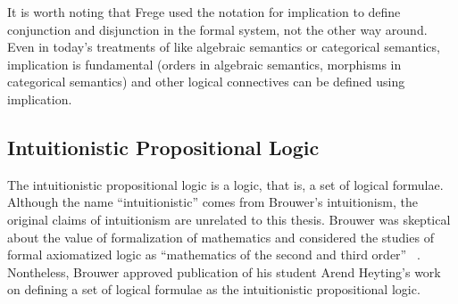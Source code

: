 It is worth noting that Frege used the notation for implication to
define conjunction and
disjunction in the formal system, not the other way around.  Even in
today's treatments of
like algebraic semantics or categorical semantics, implication is
fundamental (orders in algebraic semantics, morphisms in categorical
semantics) and other logical connectives
can be defined using implication.

\subsection{Intuitionistic Propositional Logic}

The intuitionistic propositional logic is a logic, that is, a set of
logical formulae.
Although the name ``intuitionistic'' comes from Brouwer's
intuitionism,
the original claims of intuitionism are unrelated to this thesis.
Brouwer was skeptical about the value of formalization of
mathematics and considered the studies of formal axiomatized logic as
``mathematics of the second and third order''%
~\citep[p.~10]{stigt1998}.
Nontheless, Brouwer approved publication of his student Arend Heyting's
work on defining a set of logical formulae as the intuitionistic
propositional logic.

